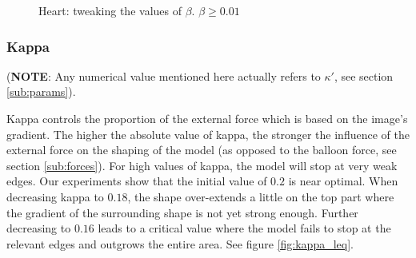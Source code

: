 \begin{figure}[!hbt]
\centering   
{}
\caption{Heart: tweaking the values of $ \beta $. $\beta \geq 0.01$}
\label{fig:beta_geq}
\end{figure}

\subsubsection{Kappa}

(\textbf{NOTE}: Any numerical value mentioned here actually refers to $ \kappa' $, see section \ref{sub:params}). 

Kappa controls the proportion of the external force which is based on the image's gradient. The higher the absolute value of kappa, the stronger the influence of the external force on the shaping of the model (as opposed to the balloon force, see section \ref{sub:forces}). For high values of kappa, the model will stop at very weak edges. Our experiments show that the initial value of $0.2$ is near optimal. When decreasing kappa to $0.18$, the shape over-extends a little on the top part where the gradient of the surrounding shape is not yet strong enough. Further decreasing to $0.16$ leads to a critical value where the model fails to stop at the relevant edges and outgrows the entire area. See figure \ref{fig:kappa_leq}.

